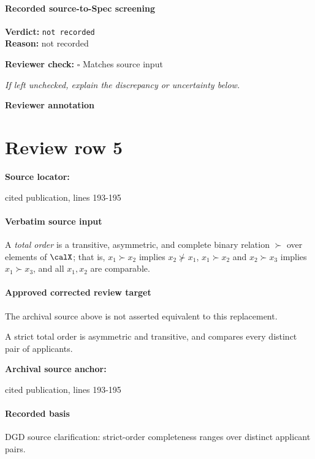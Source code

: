 \documentclass[10pt]{article}
\newcommand{\reviewerbox}{%
  \par\noindent\fbox{\parbox{0.96\linewidth}{\rule{0pt}{0.38in}}}\par
}
\newcommand{\reviewmatch}[1]{%
  \par\noindent\textbf{Reviewer check:} $\square$\; #1\par
  \noindent\emph{If left unchecked, explain the discrepancy or uncertainty below.}\par
}
\begin{document}
\paragraph{Recorded source-to-Spec screening}
\textbf{Verdict:} \texttt{not recorded}
\\
\textbf{Reason:} not recorded
\reviewmatch{Matches source input}
\noindent\textbf{Reviewer annotation}\par
\reviewerbox
\clearpage
\hypertarget{source-claim-9a3be13c89f94ffe}{}
\section*{Review row 5}
\textbf{Source locator:} {\footnotesize\raggedright cited publication, lines 193-\allowbreak{}195\par}
\paragraph{Verbatim source input}
\begin{ReviewVerbatim}
\begin{definition} \label{def:total_order}
    A \emph{total order} is a transitive, asymmetric, and complete binary relation $\succ$ over elements of $\calX$; that is, $x_1 \succ x_2$ implies $x_2 \not\succ x_1$, $x_1 \succ x_2$ and $x_2 \succ x_3$ implies $x_1 \succ x_3$, and all $x_1, x_2$ are comparable.
\end{definition}
\end{ReviewVerbatim}

\paragraph{Approved corrected review target}
The archival source above is not asserted equivalent to this replacement.
\begin{ReviewVerbatim}
A strict total order is asymmetric and transitive, and compares every distinct pair of applicants.
\end{ReviewVerbatim}

\textbf{Archival source anchor:} {\footnotesize\raggedright cited publication, lines 193-\allowbreak{}195\par}
\paragraph{Recorded basis}
DGD source clarification:\allowbreak{} strict-\allowbreak{}order completeness ranges over distinct applicant pairs.\allowbreak{}
\end{document}
